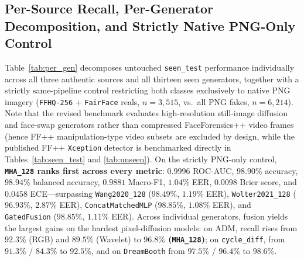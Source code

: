 \documentclass[fleqn,10pt]{wlscirep}
\begin{document}
\subsection*{Per-Source Recall, Per-Generator Decomposition, and Strictly Native PNG-Only Control}
Table~\ref{tab:per_gen} decomposes untouched \texttt{seen\_test} performance individually across all three authentic sources and all thirteen seen generators, together with a strictly same-pipeline control restricting both classes exclusively to native PNG imagery (\texttt{FFHQ-256} + \texttt{FairFace} reals, $n=3,515$, vs.\ all PNG fakes, $n=6,214$). Note that the revised benchmark evaluates high-resolution still-image diffusion and face-swap generators rather than compressed FaceForensics++ video frames (hence FF++ manipulation-type video subsets are excluded by design, while the published FF++ \texttt{Xception} detector is benchmarked directly in Tables~\ref{tab:seen_test} and \ref{tab:unseen}). On the strictly PNG-only control, \textbf{\texttt{MHA\_128} ranks first across every metric}: $0.9996$ ROC-AUC, $98.90\%$ accuracy, $98.94\%$ balanced accuracy, $0.9881$ Macro-F1, $1.04\%$ EER, $0.0098$ Brier score, and $0.0458$ ECE---surpassing \texttt{Wang2020\_128} ($98.49\%$, $1.19\%$ EER), \texttt{Wolter2021\_128} ($96.93\%$, $2.87\%$ EER), \texttt{ConcatMatchedMLP} ($98.85\%$, $1.08\%$ EER), and \texttt{GatedFusion} ($98.85\%$, $1.11\%$ EER). Across individual generators, fusion yields the largest gains on the hardest pixel-diffusion models: on ADM, recall rises from $92.3\%$ (RGB) and $89.5\%$ (Wavelet) to \textbf{$96.8\%$ (\texttt{MHA\_128})}; on \texttt{cycle\_diff}, from $91.3\%$ / $84.3\%$ to \textbf{$92.5\%$}, and on \texttt{DreamBooth} from $97.5\%$ / $96.4\%$ to \textbf{$98.6\%$}.
\end{document}
